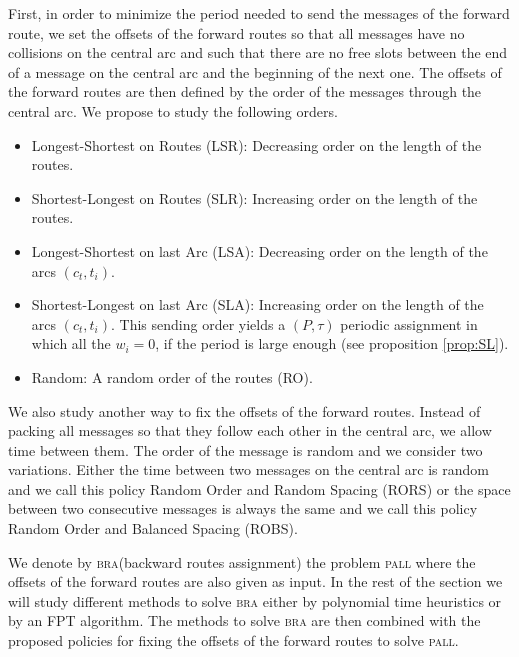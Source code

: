 \documentclass[a4paper,10pt]{article}
\newcommand{\todo}[1]{{\color{red} TODO: {#1}}}
\newcommand\pall{\textsc{pall}\xspace}
\newcommand\bra{\textsc{bra}\xspace}
\begin{document}
     First, in order to minimize the period needed to send the messages of the forward route, we set the offsets of the forward routes so that all messages have no collisions on the central arc and such that there are no free slots between the end of a message on the central arc and the beginning of the next one.
     The offsets of the forward routes are then defined by the order of the messages through the central arc. We propose to study the following orders. 
	\begin{itemize}
	 
	 \item Longest-Shortest on Routes (LSR): Decreasing order on the length of the routes.
	 \item Shortest-Longest on Routes (SLR): Increasing order on the length of the routes. 
	 \item Longest-Shortest on last Arc (LSA): Decreasing order on the length of the arcs $(c_t,t_i)$.
	 \item Shortest-Longest on last Arc (SLA): Increasing order on the length of the arcs $(c_t,t_i)$. This sending order yields a $(P,\tau)$ periodic assignment in which all the $w_i = 0$, if the period is large enough (see proposition \ref{prop:SL}).
	 \item Random: A random order of the routes (RO).
	\end{itemize}

    We also study another way to fix the offsets of the forward routes. Instead of packing all messages so that they follow each other
    in the central arc, we allow time between them. The order of the message is random and we consider two variations. 
    Either the time between two messages on the central arc is random and we call this policy Random Order and Random Spacing (RORS) or the space between two consecutive messages is always the same and we call this policy Random Order and Balanced Spacing (ROBS).
 	
    We denote by \bra (backward routes assignment) the problem \pall where the offsets of the forward routes are also given as input.
    In the rest of the section we will study different methods to solve \bra either by polynomial time heuristics or by an FPT algorithm. The methods to solve \bra are then combined with the proposed policies for fixing the offsets of the forward routes
    to solve \pall.  
   
\end{document}
